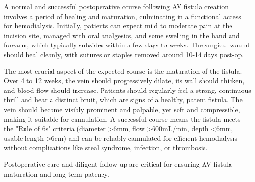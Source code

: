 A normal and successful postoperative course following AV fistula creation involves a period of healing and maturation, culminating in a functional access for hemodialysis. Initially, patients can expect mild to moderate pain at the incision site, managed with oral analgesics, and some swelling in the hand and forearm, which typically subsides within a few days to weeks. The surgical wound should heal cleanly, with sutures or staples removed around 10-14 days post-op.

The most crucial aspect of the expected course is the maturation of the fistula. Over 4 to 12 weeks, the vein should progressively dilate, its wall should thicken, and blood flow should increase. Patients should regularly feel a strong, continuous thrill and hear a distinct bruit, which are signs of a healthy, patent fistula. The vein should become visibly prominent and palpable, yet soft and compressible, making it suitable for cannulation. A successful course means the fistula meets the "Rule of 6s" criteria (diameter >6mm, flow >600mL/min, depth <6mm, usable length >6cm) and can be reliably cannulated for efficient hemodialysis without complications like steal syndrome, infection, or thrombosis.

Postoperative care and diligent follow-up are critical for ensuring AV fistula maturation and long-term patency.

